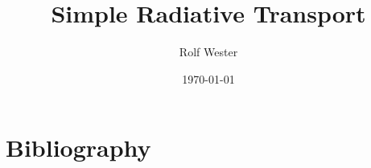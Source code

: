 \documentclass[fleqn]{scrartcl}
\title{Simple Radiative Transport}
\author{Rolf Wester}
\date{\today}
\begin{document}
\maketitle
\tableofcontents

\graphicspath{{figures/} }






\newpage
\section{Bibliography}
\printbibliography[heading=none]  

\newpage
\appendix


\newpage



\newpage

%
\end{document}
